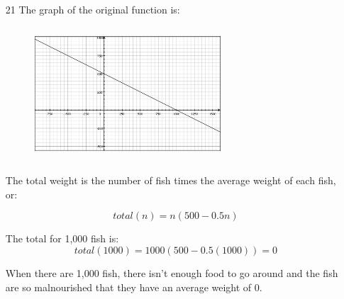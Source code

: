 \documentclass[fleqn,addpoints]{exam}
\begin{document}
\begin{itemize}
\item[21]
The graph of the original function is:
\begin{figure}[H]
  \includegraphics[width=7cm,height=5cm]{problem-21}
\end{figure}

The total weight is the number of fish times the average weight of each fish, or:

\[
  total(n) = n(500 - 0.5n)
\]

The total for 1,000 fish is: 
\[
  total(1000) = 1000(500 - 0.5(1000)) = 0
\]

When there are 1,000 fish, there isn't enough food to go around and the fish are so malnourished that they have an
average weight of 0.

\end{itemize}
\end{document}
